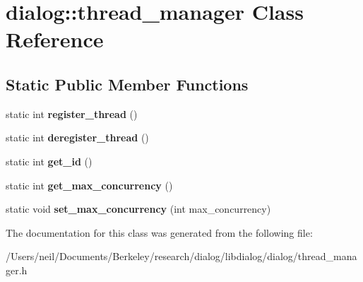 \hypertarget{classdialog_1_1thread__manager}{}\section{dialog\+:\+:thread\+\_\+manager Class Reference}
\label{classdialog_1_1thread__manager}
\subsection*{Static Public Member Functions}
\begin{DoxyCompactItemize}
\item 
\mbox{\label{classdialog_1_1thread__manager_a18e7d2c9ae2a24f9da7fa3332e3f38b4}} 
static int {\bfseries register\+\_\+thread} ()
\item 
\mbox{\label{classdialog_1_1thread__manager_a2b4200174cd631269ad163eb86cf62da}} 
static int {\bfseries deregister\+\_\+thread} ()
\item 
\mbox{\label{classdialog_1_1thread__manager_a40409126eb9acc60cd0db5dcec5c3989}} 
static int {\bfseries get\+\_\+id} ()
\item 
\mbox{\label{classdialog_1_1thread__manager_abbb25c0f4a3547b80a1a838104346eff}} 
static int {\bfseries get\+\_\+max\+\_\+concurrency} ()
\item 
\mbox{\label{classdialog_1_1thread__manager_a6ebc44ebf3c68ea11b554afb502a18cc}} 
static void {\bfseries set\+\_\+max\+\_\+concurrency} (int max\+\_\+concurrency)
\end{DoxyCompactItemize}


The documentation for this class was generated from the following file\+:\begin{DoxyCompactItemize}
\item 
/\+Users/neil/\+Documents/\+Berkeley/research/dialog/libdialog/dialog/thread\+\_\+manager.\+h\end{DoxyCompactItemize}
